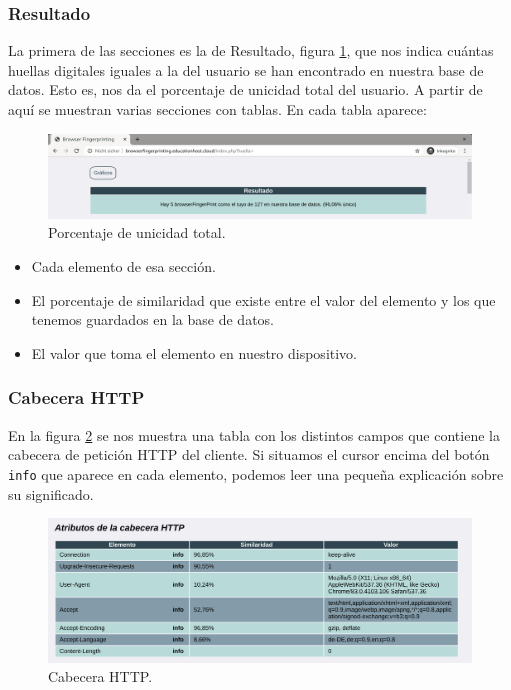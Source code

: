 \subsubsection{Resultado}
La primera de las secciones es la de Resultado, figura \ref{fig:resultadoSection}, que nos indica cuántas huellas digitales iguales a la del usuario se han encontrado en nuestra base de datos. Esto es, nos da el porcentaje de unicidad total del usuario. A partir de aquí se muestran varias secciones con tablas. En cada tabla aparece: \par

\begin{figure}[tbp]
	\centering
	\includegraphics[width=1\textwidth]{Images/resultadoSection.png}
	\caption{Porcentaje de unicidad total.}
	\label{fig:resultadoSection}
\end{figure}

\begin{itemize}
	\item Cada elemento de esa sección.
	\item El porcentaje de similaridad que existe entre el valor del elemento y los que tenemos guardados en la base de datos.
	\item El valor que toma el elemento en nuestro dispositivo.
\end{itemize}

\subsubsection{Cabecera HTTP}
En la figura \ref{fig:headersSection} se nos muestra una tabla con los distintos campos que contiene la cabecera de petición HTTP del cliente. Si situamos el cursor encima del botón \texttt{info} que aparece en cada elemento, podemos leer una pequeña explicación sobre su significado.

\begin{figure}[tbp]
	\centering
	\includegraphics[width=1\textwidth]{Images/headersSection.png}
	\caption{Cabecera HTTP.}
	\label{fig:headersSection}
\end{figure}

